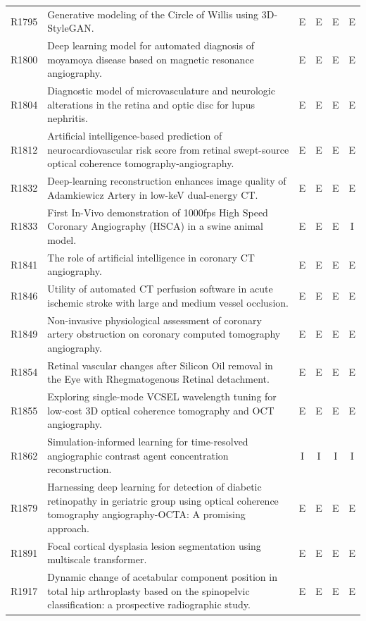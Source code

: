 \begin{longtable}{@{}l p{8.6cm} c c c c@{}}
R1795 & Generative modeling of the Circle of Willis using 3D-StyleGAN. & E & E & E & E \\
R1800 & Deep learning model for automated diagnosis of moyamoya disease based on magnetic resonance angiography. & E & E & E & E \\
R1804 & Diagnostic model of microvasculature and neurologic alterations in the retina and optic disc for lupus nephritis. & E & E & E & E \\
R1812 & Artificial intelligence-based prediction of neurocardiovascular risk score from retinal swept-source optical coherence tomography-angiography. & E & E & E & E \\
R1832 & Deep-learning reconstruction enhances image quality of Adamkiewicz Artery in low-keV dual-energy CT. & E & E & E & E \\
R1833 & First In-Vivo demonstration of 1000fps High Speed Coronary Angiography (HSCA) in a swine animal model. & E & E & E & I \\
R1841 & The role of artificial intelligence in coronary CT angiography. & E & E & E & E \\
R1846 & Utility of automated CT perfusion software in acute ischemic stroke with large and medium vessel occlusion. & E & E & E & E \\
R1849 & Non-invasive physiological assessment of coronary artery obstruction on coronary computed tomography angiography. & E & E & E & E \\
R1854 & Retinal vascular changes after Silicon Oil removal in the Eye with Rhegmatogenous Retinal detachment. & E & E & E & E \\
R1855 & Exploring single-mode VCSEL wavelength tuning for low-cost 3D optical coherence tomography and OCT angiography. & E & E & E & E \\
R1862 & Simulation-informed learning for time-resolved angiographic contrast agent concentration reconstruction. & I & I & I & I \\
R1879 & Harnessing deep learning for detection of diabetic retinopathy in geriatric group using optical coherence tomography angiography-OCTA: A promising approach. & E & E & E & E \\
R1891 & Focal cortical dysplasia lesion segmentation using multiscale transformer. & E & E & E & E \\
R1917 & Dynamic change of acetabular component position in total hip arthroplasty based on the spinopelvic classification: a prospective radiographic study. & E & E & E & E \\

\end{longtable}
